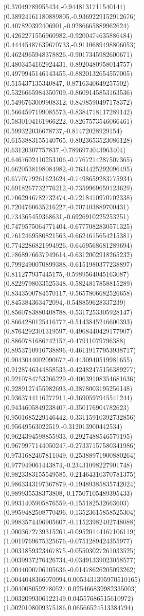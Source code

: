 {(0.37049789955434,-0.9448131711540144)
(0.38924161180889805,-0.9369229152912676)
(0.407820392406901,-0.9286665889962624)
(0.4262271556960982,-0.9200474635886484)
(0.44445487639670733,-0.9110689498806053)
(0.4624965948378826,-0.9017345982600671)
(0.4803454162924431,-0.8920480958014757)
(0.4979945146143455,-0.8820132654557005)
(0.515437135340847,-0.8716340649257502)
(0.5326665984350709,-0.8609145853163536)
(0.5496763009908312,-0.8498590497178372)
(0.5664597199085573,-0.8384718117289142)
(0.5830104161966222,-0.8267573546066461)
(0.599322036678737,-0.81472028929154)
(0.6153883155140765,-0.8023653523086128)
(0.63120307757837,-0.7896974043963404)
(0.6467602410253106,-0.7767214287507365)
(0.6620538198084982,-0.7634425292096495)
(0.6770779261623624,-0.7498659283775934)
(0.6918267732776212,-0.7359969659123629)
(0.7062946782732474,-0.7218410970702338)
(0.7204760635216227,-0.707403889700431)
(0.734365459368631,-0.6926910225253251)
(0.7479575064771404,-0.6777082830571325)
(0.7612469580821563,-0.6624615654215381)
(0.7742286821994926,-0.6469568681289694)
(0.7868976637949614,-0.6312002918265232)
(0.7992490070899388,-0.6151980377238897)
(0.811277937445175,-0.5989564045163087)
(0.8229798033525348,-0.5824817858815289)
(0.8343500784570117,-0.5657806682526658)
(0.845384363472094,-0.548859628337239)
(0.8560783880408788,-0.5317253305928147)
(0.8664280125416777,-0.5143845246600393)
(0.8764292301319597,-0.4968440429177907)
(0.8860781686742157,-0.47911079796388)
(0.8953710916738896,-0.46119177953938717)
(0.9043044002090677,-0.4430940519981655)
(0.9128746344858533,-0.42482475156389277)
(0.9210784753266229,-0.40639108354681636)
(0.9289127455982693,-0.3878003195256148)
(0.9363744116277911,-0.3690597945541244)
(0.9434605849238407,-0.350176904782623)
(0.9501685229146442,-0.33115910392732856)
(0.95649563022519,-0.312013900442534)
(0.9624394598855933,-0.2927488546579195)
(0.9679977144050247,-0.27337157580341986)
(0.9731682467811049,-0.25388971900880264)
(0.977949061443874,-0.23431098227901748)
(0.9823383155549585,-0.21464310370781375)
(0.9863343197367879,-0.19489385835742024)
(0.989935538373808,-0.17507105489395433)
(0.9931405905876559,-0.155182532663603)
(0.9959482508770496,-0.13523615858525304)
(0.9983574496905607,-0.11523982402748088)
(1.0003672739315261,-0.09520144167106119)
(1.0019769675325676,-0.0751289424355977)
(1.0031859323467875,-0.05503027261033525)
(1.0039937276426734,-0.03491339023058577)
(1.0044000706105636,-0.01478626205093262)
(1.0044048366070994,0.0053431395970510165)
(1.0040080592780527,0.025466839982335003)
(1.0032099306122149,0.04557686515610972)
(1.0020108009375186,0.06566524513384794)
}
